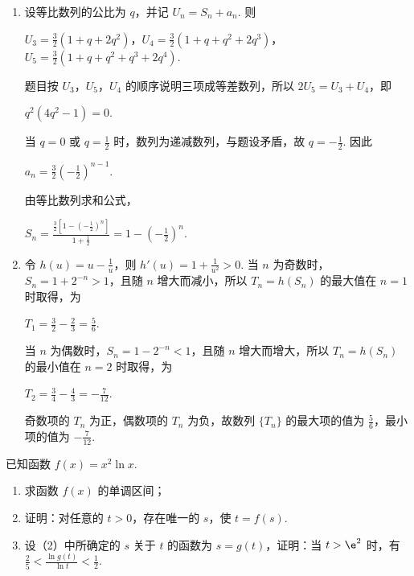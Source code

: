 \begin{solution}
\begin{enumerate}
\item 设等比数列的公比为 \(q\)，并记 \(U_n=S_n+a_n\). 则

\(U_3=\frac{3}{2}(1+q+2q^2)\)，\(U_4=\frac{3}{2}(1+q+q^2+2q^3)\)，\(U_5=\frac{3}{2}(1+q+q^2+q^3+2q^4)\).

题目按 \(U_3\)，\(U_5\)，\(U_4\) 的顺序说明三项成等差数列，所以 \(2U_5=U_3+U_4\)，即

\(q^2(4q^2-1)=0\).

当 \(q=0\) 或 \(q=\frac{1}{2}\) 时，数列为递减数列，与题设矛盾，故 \(q=-\frac{1}{2}\). 因此

\(a_n=\frac{3}{2}\left(-\frac{1}{2}\right)^{n-1}\).

由等比数列求和公式，

\(S_n=\frac{\frac{3}{2}\left[1-\left(-\frac{1}{2}\right)^n\right]}{1+\frac{1}{2}}=1-\left(-\frac{1}{2}\right)^n\).

\item 令 \(h(u)=u-\frac{1}{u}\)，则 \(h'(u)=1+\frac{1}{u^2}>0\). 当 \(n\) 为奇数时，\(S_n=1+2^{-n}>1\)，且随 \(n\) 增大而减小，所以 \(T_n=h(S_n)\) 的最大值在 \(n=1\) 时取得，为

\(T_1=\frac{3}{2}-\frac{2}{3}=\frac{5}{6}\).

当 \(n\) 为偶数时，\(S_n=1-2^{-n}<1\)，且随 \(n\) 增大而增大，所以 \(T_n=h(S_n)\) 的最小值在 \(n=2\) 时取得，为

\(T_2=\frac{3}{4}-\frac{4}{3}=-\frac{7}{12}\).

奇数项的 \(T_n\) 为正，偶数项的 \(T_n\) 为负，故数列 \(\{T_n\}\) 的最大项的值为 \(\frac{5}{6}\)，最小项的值为 \(-\frac{7}{12}\).
\end{enumerate}
\end{solution}

\begin{problem}
已知函数 \( f(x) = x^2 \ln x \).
\begin{enumerate}
\item 求函数 \( f(x) \) 的单调区间；
\item 证明：对任意的 \(t > 0\)，存在唯一的 \(s\)，使 \(t = f(s)\).
\item 设（2）中所确定的 \(s\) 关于 \(t\) 的函数为 \(s = g(t)\)，证明：当 \(t > \e^2\) 时，有 \( \frac {2}{5} < \frac {\ln g(t)}{\ln t} < \frac {1}{2} \).
\end{enumerate}
\end{problem}

